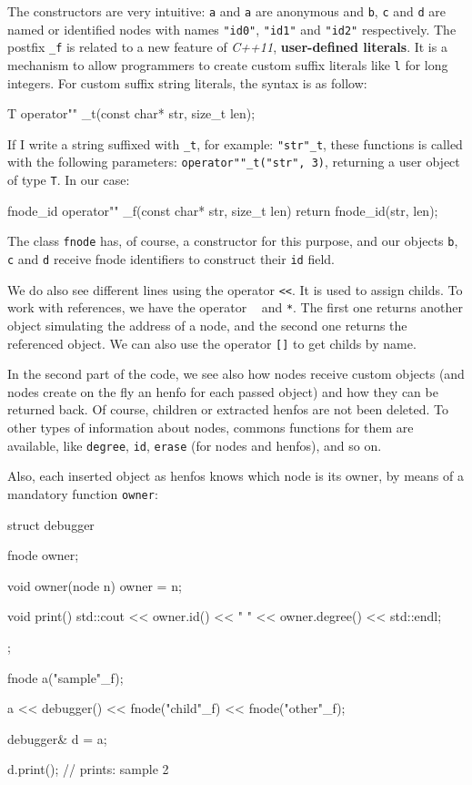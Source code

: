 \documentclass{article}
\begin{document}
The constructors are very intuitive: \texttt{a} and \texttt{a} are anonymous and
\texttt{b}, \texttt{c} and \texttt{d} are named or identified nodes with names
\texttt{"id0"}, \texttt{"id1"} and \texttt{"id2"} respectively. The postfix
\texttt{\_f} is related to a new feature of \textit{C++11}, \textbf{user-defined
  literals}. It is a mechanism to allow programmers to create custom suffix
literals like \texttt{l} for long integers. For custom suffix string literals,
the syntax is as follow:

\begin{Cpp}
T operator"" _t(const char* str, size_t len);
\end{Cpp}

If I write a string suffixed with \texttt{\_t}, for example: \texttt{"str"\_t},
these functions is called with the following parameters:
\texttt{operator""\_t("str", 3)}, returning a user object of type \texttt{T}. In
our case:

\begin{Cpp}
  fnode_id operator"" _f(const char* str, size_t len)
  {
     return fnode_id(str, len);
  }
\end{Cpp}

The class \texttt{fnode} has, of course, a constructor for this purpose, and our
objects \texttt{b}, \texttt{c} and \texttt{d} receive fnode identifiers to
construct their \texttt{id} field.

We do also see different lines using the operator \texttt{<<}. It is used to
assign childs. To work with references, we have the operator \texttt{~} and
\texttt{*}. The first one returns another object simulating the address of a
node, and the second one returns the referenced object. We can also use the
operator \texttt{[]} to get childs by name.

In the second part of the code, we see also how nodes receive custom objects
(and nodes create on the fly an henfo for each passed object) and how they can
be returned back. Of course, children or extracted henfos are not been
deleted. To other types of information about nodes, commons functions for them
are available, like \texttt{degree}, \texttt{id}, \texttt{erase} (for nodes and
henfos), and so on.

Also, each inserted object as henfos knows which node is its owner, by means of
a mandatory function \texttt{owner}:

\begin{Cpp}
  struct debugger
  {
     fnode owner;

     void owner(node n) { owner = n; }

     void print()
     {
        std::cout << owner.id() << " " << owner.degree() << std::endl;
     }
  };

  fnode a("sample"_f);

  a << debugger() << fnode("child"_f) << fnode("other"_f);

  debugger& d = a;

  d.print(); // prints: sample 2
\end{Cpp}
\end{document}

